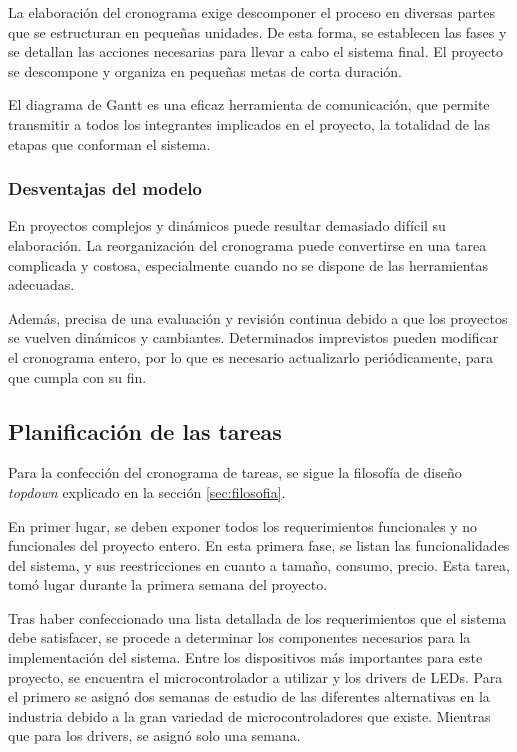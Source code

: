 La elaboración del cronograma exige descomponer el proceso en diversas partes que se estructuran en pequeñas unidades. De esta forma, se establecen las fases y se detallan las acciones necesarias para llevar a cabo el sistema final. El proyecto se descompone y organiza en pequeñas metas de corta duración.

El diagrama de Gantt es una eficaz herramienta de comunicación, que permite transmitir a todos los integrantes implicados en el proyecto, la totalidad de las etapas que conforman el sistema.

\subsubsection{Desventajas del modelo}
En proyectos complejos y dinámicos puede resultar demasiado difícil su elaboración. La reorganización del cronograma puede convertirse en una tarea complicada y costosa, especialmente cuando no se dispone de las herramientas adecuadas.

Además, precisa de una evaluación y revisión continua debido a que los proyectos se vuelven dinámicos y cambiantes. Determinados imprevistos pueden modificar el cronograma entero, por lo que es necesario actualizarlo periódicamente, para que cumpla con su fin.

\subsection{Planificación de las tareas}

Para la confección del cronograma de tareas, se sigue la filosofía de diseño \emph{topdown} explicado en la sección \ref{sec:filosofia}.

En primer lugar, se deben exponer todos los requerimientos funcionales y no funcionales del proyecto entero.
En esta primera fase, se listan las funcionalidades del sistema, y sus reestricciones en cuanto a tamaño, consumo, precio.
Esta tarea, tomó lugar durante la primera semana del proyecto.

Tras haber confeccionado una lista detallada de los requerimientos que el sistema debe satisfacer, se procede a determinar los componentes necesarios para la implementación del sistema.
Entre los dispositivos más importantes para este proyecto, se encuentra el microcontrolador a utilizar y los drivers de LEDs.
Para el primero se asignó dos semanas de estudio de las diferentes alternativas en la industria debido a la gran variedad de microcontroladores que existe. Mientras que para los drivers, se asignó solo una semana.

